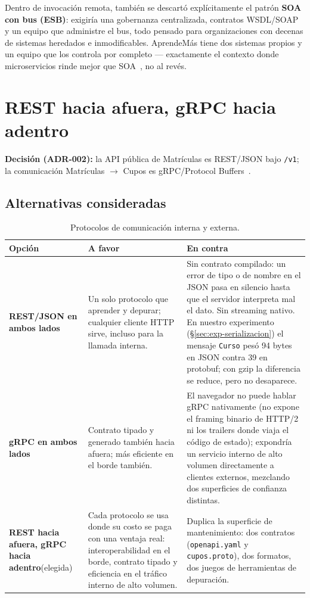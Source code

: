 \documentclass[11pt,spanish]{article}
\begin{document}
Dentro de invocación remota, también se descartó explícitamente el patrón \textbf{SOA con bus (ESB)}: exigiría una gobernanza centralizada, contratos WSDL/SOAP y un equipo que administre el bus, todo pensado para organizaciones con decenas de sistemas heredados e inmodificables. AprendeMás tiene dos sistemas propios y un equipo que los controla por completo — exactamente el contexto donde microservicios rinde mejor que SOA~\cite{fowlerlewis}, no al revés.

\section{REST hacia afuera, gRPC hacia adentro}

\textbf{Decisión (ADR-002):} la API pública de Matrículas es REST/JSON bajo \texttt{/v1}; la comunicación Matrículas $\to$ Cupos es gRPC/Protocol Buffers~\cite{protobuf}.

\subsection{Alternativas consideradas}

\begin{table}[H]
\centering
\small
\begin{tabularx}{\textwidth}{p{3.6cm} X X}
\toprule
\textbf{Opción} & \textbf{A favor} & \textbf{En contra} \\
\midrule
\textbf{REST/JSON en ambos lados} & Un solo protocolo que aprender y depurar; cualquier cliente HTTP sirve, incluso para la llamada interna. & Sin contrato compilado: un error de tipo o de nombre en el JSON pasa en silencio hasta que el servidor interpreta mal el dato. Sin streaming nativo. En nuestro experimento (\S\ref{sec:exp-serializacion}) el mensaje \texttt{Curso} pesó 94 bytes en JSON contra 39 en protobuf; con gzip la diferencia se reduce, pero no desaparece. \\
\addlinespace
\textbf{gRPC en ambos lados} & Contrato tipado y generado también hacia afuera; más eficiente en el borde también. & El navegador no puede hablar gRPC nativamente (no expone el framing binario de HTTP/2 ni los trailers donde viaja el código de estado); expondría un servicio interno de alto volumen directamente a clientes externos, mezclando dos superficies de confianza distintas. \\
\addlinespace
\textbf{REST hacia afuera, gRPC hacia adentro}\newline (elegida) & Cada protocolo se usa donde su costo se paga con una ventaja real: interoperabilidad en el borde, contrato tipado y eficiencia en el tráfico interno de alto volumen. & Duplica la superficie de mantenimiento: dos contratos (\texttt{openapi.yaml} y \texttt{cupos.proto}), dos formatos, dos juegos de herramientas de depuración. \\
\bottomrule
\end{tabularx}
\caption{Protocolos de comunicación interna y externa.}
\end{table}
\end{document}
